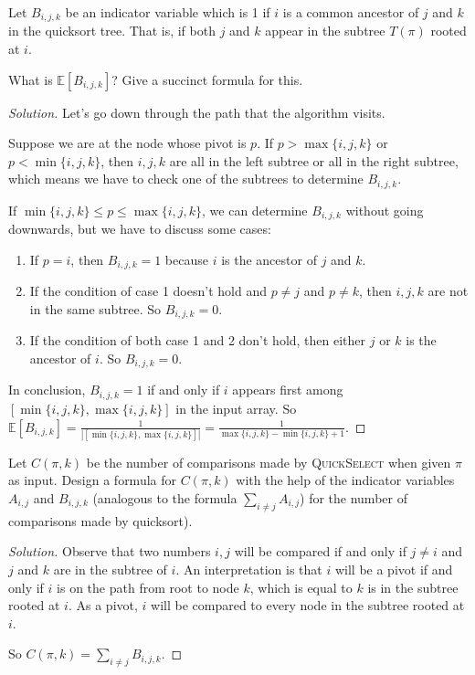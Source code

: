 \newpage
\begin{thm}{}{}
    Let $B_{i,j,k}$ be an indicator variable which is 1 if $i$ is a common ancestor of  $j$ and $k$ in the quicksort tree. That is, if both $j$ and $k$ appear in the subtree $T(\pi)$ rooted at $i$.
    
    What is $\mathbb{E}[B_{i,j,k}]$? Give a succinct formula for this.
\end{thm}

\begin{proof}[Solution]
    Let's go down through the path that the algorithm visits.
    
    Suppose we are at the node whose pivot is $p$. If $p > \max\{i,j,k\}$ or $p < \min\{i,j,k\}$, then $i,j,k$ are all in the left subtree or all in the right subtree, which means we have to check one of the subtrees to determine $B_{i,j,k}$.
      
    If $\min\{i,j,k\} \leqslant p \leqslant \max\{i,j,k\}$, we can determine $B_{i,j,k}$ without going downwards, but we have to discuss some cases:
    \begin{enumerate}
        \item If $p=i$, then $B_{i,j,k}=1$ because $i$ is the ancestor of $j$ and $k$.
        \item If the condition of case 1 doesn't hold and $p\ne j$ and $p\ne k$, then $i,j,k$ are not in the same subtree. So $B_{i,j,k}=0$.
        \item If the condition of both case 1 and 2 don't hold, then either $j$ or $k$ is the ancestor of $i$. So $B_{i,j,k}=0$.
    \end{enumerate}
    
    In conclusion,  $B_{i,j,k}=1$ if and only if $i$ appears first among $[\min\{i,j,k\},\max\{i,j,k\}]$ in the input array. So  $\mathbb{E}[B_{i,j,k}]=\frac{1}{|[\min\{i,j,k\},\max\{i,j,k\}]|}=\frac{1}{\max\{i,j,k\}-\min\{i,j,k\}+1}$.
\end{proof}

\begin{thm}{}{}
    Let $C(\pi,k)$ be the number of comparisons made by \textsc{QuickSelect} when given $\pi$ as input. Design a formula for $C(\pi,k)$ with the help of the indicator variables $A_{i,j}$ and $B_{i,j,k}$ (analogous to the formula $\sum_{i\ne j}A_{i,j}$) for the number of comparisons made by quicksort).
\end{thm}

\begin{proof}[Solution]
    Observe that two numbers $i,j$ will be compared if and only if $j\ne i$ and $j$ and $k$ are in the subtree of $i$. An interpretation is that $i$ will be a pivot if and only if $i$ is on the path from root to node $k$, which is equal to $k$ is in the subtree rooted at $i$. As a pivot, $i$ will be compared to every node in the subtree rooted at $i$.
    
    So $C(\pi,k)=\sum_{i\ne j}B_{i,j,k}$.
\end{proof}

